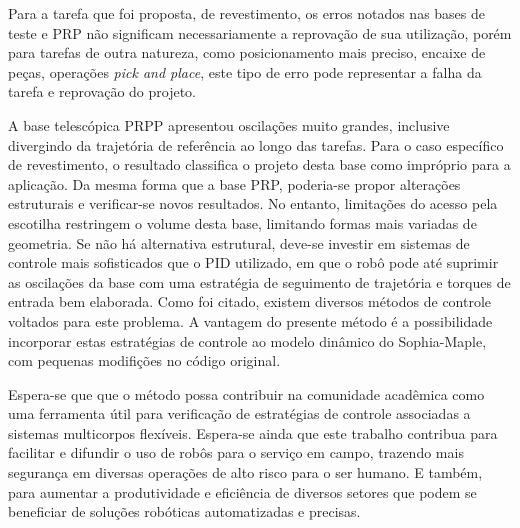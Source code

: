 Para a tarefa que foi proposta, de revestimento, os erros notados nas bases de
teste e PRP não significam necessariamente a reprovação de sua utilização, porém
para tarefas de outra natureza, como posicionamento mais preciso, encaixe de
peças, operações \textit{pick and place}, este tipo de erro pode representar a
falha da tarefa e reprovação do projeto.

A base telescópica PRPP apresentou oscilações muito grandes, inclusive
divergindo da trajetória de referência ao longo das tarefas. Para o caso
específico de revestimento, o resultado classifica o projeto desta base como
impróprio para a aplicação. Da mesma forma que a base PRP, poderia-se propor
alterações estruturais e verificar-se novos resultados. No entanto, limitações
do acesso pela escotilha restringem o volume desta base, limitando formas mais
variadas de geometria. Se não há alternativa estrutural, deve-se investir em
sistemas de controle mais sofisticados que o PID utilizado, em que o robô pode
até suprimir as oscilações da base com uma estratégia de seguimento de
trajetória e torques de entrada bem elaborada. Como foi citado, existem diversos
métodos de controle voltados para este problema. A vantagem do presente método é
a possibilidade incorporar estas estratégias de controle ao modelo dinâmico do
Sophia-Maple, com pequenas modifições no código original.


Espera-se que que o método possa contribuir na comunidade acadêmica como uma
ferramenta útil para verificação de estratégias de controle associadas a
sistemas multicorpos flexíveis. Espera-se ainda que este trabalho contribua para
facilitar e difundir o uso de robôs para o serviço em campo, trazendo mais
segurança em diversas operações de alto risco para o ser humano. E também, para
aumentar a produtividade e eficiência de diversos setores que podem se
beneficiar de soluções robóticas automatizadas e precisas.




